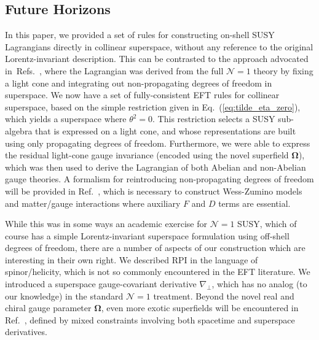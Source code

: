 \documentclass[12pt,document,nofootinbib,superscriptaddress,onecolumn,preprintnumbers,balancelastpage]{article}
\DeclareRobustCommand{\Eq}[1]{Eq.~(\ref{#1})}
\DeclareRobustCommand{\Ref}[1]{Ref.~\cite{#1}}
\DeclareRobustCommand{\Refs}[1]{Refs.~\cite{#1}}
\newcommand{\RCA}{\boldsymbol{\Omega}}
\begin{document}
\begin{spacing}{1.2}
\section{Future Horizons}
\label{sec:Outlook}
In this paper, we provided a set of rules for constructing on-shell SUSY Lagrangians directly in collinear superspace, without any reference to the original Lorentz-invariant description.
%
This can be contrasted to the approach advocated in~\Refs{Cohen:2016jzp, Cohen:2016dcl}, where the Lagrangian was derived from the full $\mathcal{N} = 1$ theory by fixing a light cone and integrating out non-propagating degrees of freedom in superspace.
%
We now have a set of fully-consistent EFT rules for collinear superspace, based on the simple restriction given in \Eq{eq:tilde_eta_zero}, which yields a superspace where $\theta^2 = 0$.
%
This restriction selects a SUSY sub-algebra that is expressed on a light cone, and whose representations are built using only propagating degrees of freedom.
%
Furthermore, we were able to express the residual light-cone gauge invariance (encoded using the novel superfield $\RCA$), which was then used to derive the Lagrangian of both Abelian and non-Abelian gauge theories.
%
A formalism for reintroducing non-propagating degrees of freedom will be provided in \Ref{Cohen:2019gsc}, which is necessary to construct Wess-Zumino models and matter/gauge interactions where auxiliary $F$ and $D$ terms are essential.


While this was in some ways an academic exercise for $\mathcal{N}=1$ SUSY, which of course has a simple Lorentz-invariant superspace formulation using off-shell degrees of freedom, there are a number of aspects of our construction which are interesting in their own right.
%
We described RPI in the language of spinor/helicity, which is not so commonly encountered in the EFT literature. 
%
We introduced a superspace gauge-covariant derivative $\nabla_\perp$, which has no analog (to our knowledge) in the standard $\mathcal{N}=1$ treatment.
%
Beyond the novel real and chiral gauge parameter $\RCA$, even more exotic superfields will be encountered in \Ref{Cohen:2019gsc}, defined by mixed constraints involving both spacetime and superspace derivatives.



\end{spacing}
\end{document}
